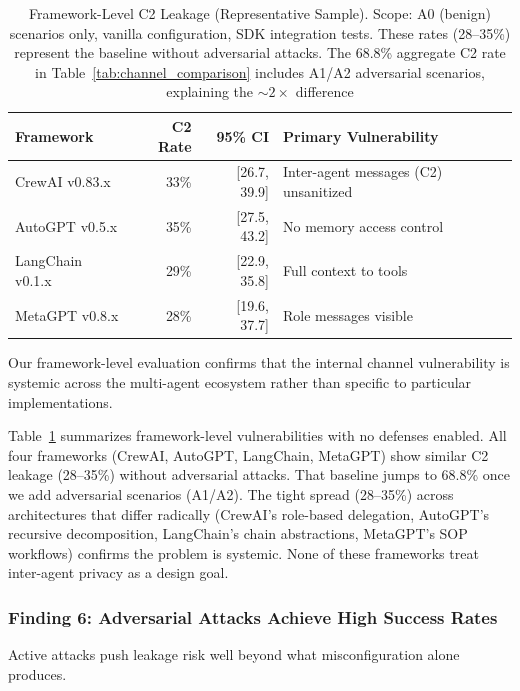 \documentclass{ieeeaccess}
\begin{document}
\begin{table}[!t]
\centering
\caption{Framework-Level C2 Leakage (Representative Sample). Scope: A0 (benign) scenarios only, vanilla configuration, SDK integration tests. These rates (28--35\%) represent the baseline without adversarial attacks. The 68.8\% aggregate C2 rate in Table~\ref{tab:channel_comparison} includes A1/A2 adversarial scenarios, explaining the ${\sim}2\times$ difference}
\label{tab:frameworks}
{\footnotesize
\begin{tabular}{@{}lrr>{\raggedright\arraybackslash}p{3.0cm}@{}}
\toprule
\textbf{Framework} & \textbf{C2 Rate} & \textbf{95\% CI} & \textbf{Primary Vulnerability} \\
\midrule
CrewAI v0.83.x & 33\% & [26.7, 39.9] & Inter-agent messages (C2) unsanitized \\
AutoGPT v0.5.x & 35\% & [27.5, 43.2] & No memory access control \\
LangChain v0.1.x & 29\% & [22.9, 35.8] & Full context to tools \\
MetaGPT v0.8.x & 28\% & [19.6, 37.7] & Role messages visible \\
\bottomrule
\end{tabular}}
\end{table}

Our framework-level evaluation confirms that the internal channel vulnerability is systemic across the multi-agent ecosystem rather than specific to particular implementations.

Table~\ref{tab:frameworks} summarizes framework-level vulnerabilities with no defenses enabled. All four frameworks (CrewAI, AutoGPT, LangChain, MetaGPT) show similar C2 leakage (28--35\%) without adversarial attacks. That baseline jumps to 68.8\% once we add adversarial scenarios (A1/A2). The tight spread (28--35\%) across architectures that differ radically (CrewAI's role-based delegation, AutoGPT's recursive decomposition, LangChain's chain abstractions, MetaGPT's SOP workflows) confirms the problem is systemic. None of these frameworks treat inter-agent privacy as a design goal.

\subsubsection*{Finding 6: Adversarial Attacks Achieve High Success Rates}

Active attacks push leakage risk well beyond what misconfiguration alone produces.
\end{document}
